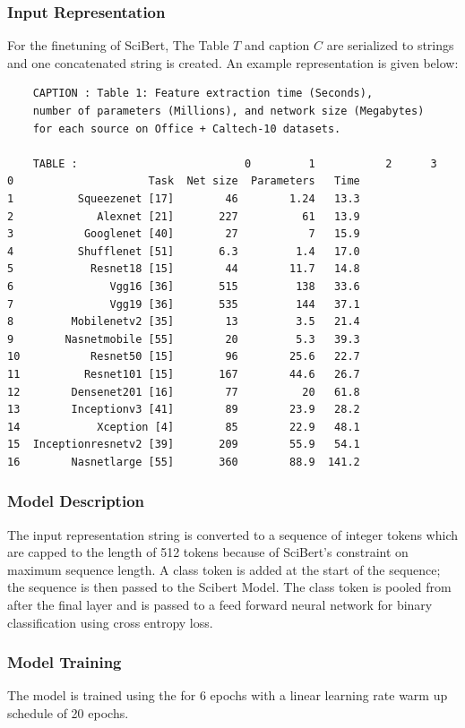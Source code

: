 \subsubsection{Input Representation}
\label{table_classification:models:sb:input_rep}
For the finetuning of SciBert, The Table $T$ and caption $C$ are serialized to strings and one concatenated string is created. An example representation is given below: 
\begin{verbatim}
    CAPTION : Table 1: Feature extraction time (Seconds), 
    number of parameters (Millions), and network size (Megabytes) 
    for each source on Office + Caltech-10 datasets.

    TABLE :                          0         1           2      3
0                     Task  Net size  Parameters   Time
1          Squeezenet [17]        46        1.24   13.3
2             Alexnet [21]       227          61   13.9
3           Googlenet [40]        27           7   15.9
4          Shufflenet [51]       6.3         1.4   17.0
5            Resnet18 [15]        44        11.7   14.8
6               Vgg16 [36]       515         138   33.6
7               Vgg19 [36]       535         144   37.1
8         Mobilenetv2 [35]        13         3.5   21.4
9        Nasnetmobile [55]        20         5.3   39.3
10           Resnet50 [15]        96        25.6   22.7
11          Resnet101 [15]       167        44.6   26.7
12        Densenet201 [16]        77          20   61.8
13        Inceptionv3 [41]        89        23.9   28.2
14            Xception [4]        85        22.9   48.1
15  Inceptionresnetv2 [39]       209        55.9   54.1
16        Nasnetlarge [55]       360        88.9  141.2
\end{verbatim}

\subsubsection{Model Description}
The input representation string is converted to a sequence of integer tokens which are capped to the length of 512 tokens because of SciBert's constraint on maximum sequence length. A class token is added at the start of the sequence; the sequence is then passed to the Scibert Model. The class token is pooled from after the final layer and is passed to a feed forward neural network for binary classification using cross entropy loss. 


\subsubsection{Model Training}
The model is trained using the for 6 epochs with a linear learning rate warm up schedule of 20 epochs.


